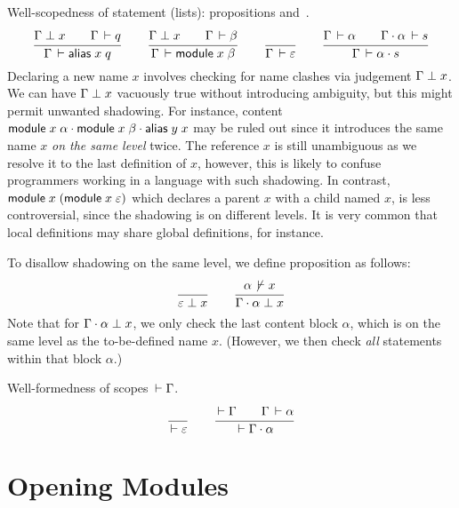 \documentclass{article}
\theoremstyle{definition}
\theoremstyle{plain}
\theoremstyle{remark}
\begin{document}
Well-scopedness of statement (lists): propositions
  and
\fbox{$\WContent \Gamma \alpha$}\,.
\begin{gather*}
  \ru{\NoClash \Gamma x \qquad \Declares \Gamma q
    }{\WContent \Gamma {\malias x q}}
\qquad
  \ru{\NoClash \Gamma x \qquad \WContent \Gamma \beta
    }{\WContent \Gamma {\mdef x \beta}
    }
\qquad
  \ru{}{\WContent \Gamma \Ge}
\qquad
  \ru{\WContent \Gamma \alpha \qquad
      \WContent {\Gamma \sep \alpha} s
    }{\WContent \Gamma {\alpha \sep s}
    }
\end{gather*}
Declaring a new name $x$ involves checking for name clashes via judgement
$\Gamma \perp x$.  We can have $\Gamma \perp x$ vacuously true
without introducing ambiguity, but this might permit unwanted
shadowing.
For instance, content $\mathsf{module}\;x\;\alpha \cdot \mathsf{module}\;x\;\beta \cdot \mathsf{alias}\;y\;x$ may be ruled out
since it introduces the same name $x$ \emph{on the same level} twice.
The reference $x$ is still unambiguous as we resolve it to the last
definition of $x$, however, this is likely to confuse programmers
working in a language with such shadowing.
In contrast, $\mathsf{module}\;x\;(\mathsf{module}\;x\;\varepsilon)$ which declares a
parent $x$ with a child named $x$, is less controversial, since the
shadowing is on different levels.  It is very common that local
definitions may share global definitions, for instance.

To disallow shadowing on the same level, we define proposition
 as follows:
\begin{gather*}
  \ru{}{\NoClash \Ge x}
\qquad
  \ru{\NotDeclares \alpha x
    }{\NoClash {\Gamma \sep \alpha} x}
\end{gather*}
Note that for $\Gamma \cdot \alpha \perp x$,
we only check the last content block $\alpha$,
which is on the same level as the to-be-defined name $x$.
(However, we then check \emph{all} statements within that block
$\alpha$.)

Well-formedness of scopes $\,\vdash\Gamma$.
\begin{gather*}
  \ru{}{\WScope \Ge}
\qquad
  \ru{\WScope \Gamma \qquad \WContent \Gamma \alpha
    }{\WScope {\Gamma \sep \alpha}}
\end{gather*}

\section{Opening Modules}
\end{document}
